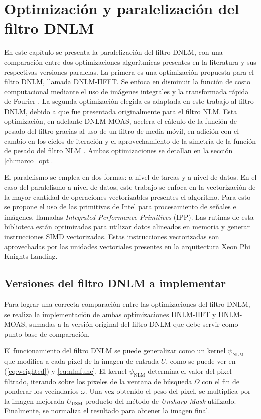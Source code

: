 \chapter{Optimizaci\'on y paralelizaci\'on del filtro DNLM}
\label{ch:solucion}

En este cap\'itulo se presenta la paralelizaci\'on del filtro DNLM, con una comparaci\'on entre dos optimizaciones algor\'itmicas presentes en la literatura y sus respectivas versiones paralelas. La primera es una optimizaci\'on propuesta para el filtro DNLM, llamada DNLM-IIFFT. Se enfoca en disminuir la funci\'on de costo computacional mediante el uso de im\'agenes integrales y la transformada r\'apida de Fourier \cite{CalderonRamirez2017}. La segunda optimizaci\'on elegida es adaptada en este trabajo al filtro DNLM, debido a que fue presentada originalmente para el filtro NLM. Esta optimizaci\'on, en adelante DNLM-MOAS, acelera el c\'alculo de la funci\'on de pesado del filtro gracias al uso de un filtro de media m\'ovil, en adici\'on con el cambio en los ciclos de iteraci\'on y el aprovechamiento de la simetr\'ia de la funci\'on de pesado del filtro NLM \cite{Condat2010}. Ambas optimizaciones se detallan en la secci\'on \ref{ch:marco_opt}.

El paralelismo se emplea en dos formas: a nivel de tareas y a nivel de datos. En el caso del paralelismo a nivel de datos, este trabajo se enfoca en la vectorizaci\'on de la mayor cantidad de operaciones vectorizables presentes el algoritmo. Para esto se propone el uso de las primitivas de Intel para procesamiento de se\~nales e im\'agenes, llamadas \textit{Integrated Performance Primitives} (IPP). Las rutinas de esta biblioteca est\'an optimizadas para utilizar datos alineados en memoria y generar instrucciones SIMD vectorizadas. Estas instrucciones vectorizadas son aprovechadas por las unidades vectoriales presentes en la arquitectura Xeon Phi Knights Landing.



\section{Versiones del filtro DNLM a implementar}

Para lograr una correcta comparaci\'on entre las optimizaciones del filtro DNLM, se realiza la implementaci\'on de ambas optimizaciones DNLM-IIFT y DNLM-MOAS, sumadas a la versi\'on original del filtro DNLM que debe servir como punto base de comparaci\'on.

El funcionamiento del filtro DNLM se puede generalizar como un kernel $\psi_{\textrm{NLM}}$ que modifica a cada pixel de la imagen de entrada $U$, como se puede ver en (\ref{eq:weighted}) y \ref{eq:nlmfunc}. El kernel $\psi_{\textrm{NLM}}$ determina el valor del pixel filtrado, iterando sobre los pixeles de la ventana de b\'usqueda $\Omega$ con el fin de ponderar los vecindarios $\omega$. Una vez obtenido el peso del pixel, se multiplica por la imagen mejorada $U_{\textrm{USM}}$ producto del m\'etodo de \textit{Unsharp Mask} utilizado.  Finalmente, se normaliza el resultado para obtener la imagen final. 

